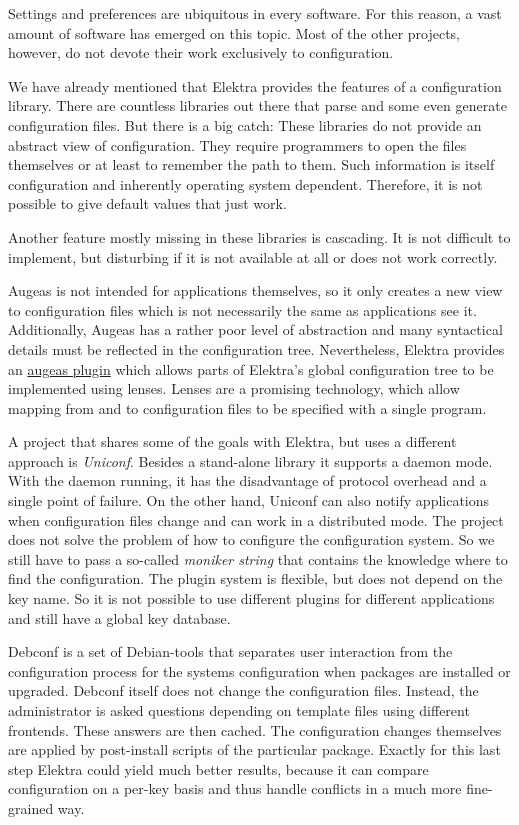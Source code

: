 Settings and preferences are ubiquitous in every software. For this reason, a vast amount of software has emerged on this topic. Most of the other projects, however, do not devote their work exclusively to configuration.

We have already mentioned that Elektra provides the features of a configuration library. There are countless libraries out there that parse and some even generate configuration files. But there is a big catch\+: These libraries do not provide an abstract view of configuration. They require programmers to open the files themselves or at least to remember the path to them. Such information is itself configuration and inherently operating system dependent. Therefore, it is not possible to give default values that just work.

Another feature mostly missing in these libraries is cascading. It is not difficult to implement, but disturbing if it is not available at all or does not work correctly.

Augeas is not intended for applications themselves, so it only creates a new view to configuration files which is not necessarily the same as applications see it. Additionally, Augeas has a rather poor level of abstraction and many syntactical details must be reflected in the configuration tree. Nevertheless, Elektra provides an \hyperlink{autotoc_md43_src_plugins_augeas_README_md}{augeas plugin} which allows parts of Elektra’s global configuration tree to be implemented using lenses. Lenses are a promising technology, which allow mapping from and to configuration files to be specified with a single program.

A project that shares some of the goals with Elektra, but uses a different approach is {\itshape Uniconf}. Besides a stand-\/alone library it supports a daemon mode. With the daemon running, it has the disadvantage of protocol overhead and a single point of failure. On the other hand, Uniconf can also notify applications when configuration files change and can work in a distributed mode. The project does not solve the problem of how to configure the configuration system. So we still have to pass a so-\/called {\itshape moniker string} that contains the knowledge where to find the configuration. The plugin system is flexible, but does not depend on the key name. So it is not possible to use different plugins for different applications and still have a global key database.

Debconf is a set of Debian-\/tools that separates user interaction from the configuration process for the system\textquotesingle{}s configuration when packages are installed or upgraded. Debconf itself does not change the configuration files. Instead, the administrator is asked questions depending on template files using different frontends. These answers are then cached. The configuration changes themselves are applied by post-\/install scripts of the particular package. Exactly for this last step Elektra could yield much better results, because it can compare configuration on a per-\/key basis and thus handle conflicts in a much more fine-\/grained way.

